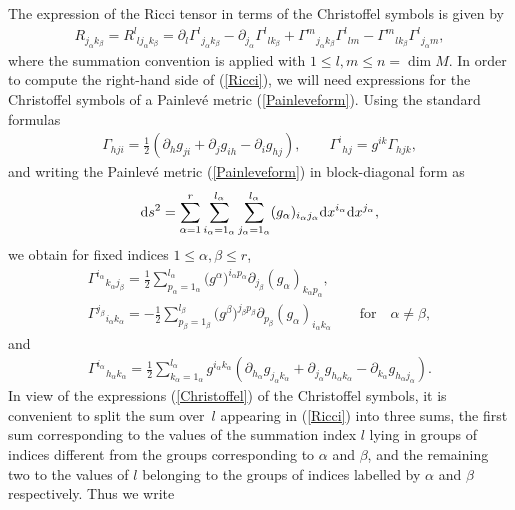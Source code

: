 \documentclass[pdftex]{sigma}
\numberwithin{equation}{section}
\newcommand{\ialpha}{i_{\alpha}}
\newcommand{\jbeta}{j_{\beta}}
\newcommand{\jalpha}{j_{\alpha}}
\newcommand{\kbeta}{k_{\beta}}
\newcommand{\lbeta}{l_{\beta}}
\newcommand{\lalpha}{l_{\alpha}}
\newcommand{\palpha}{p_{\alpha}}
\newcommand{\kalpha}{k_{\alpha}}
\newcommand{\pbeta}{p_{\beta}}
\newcommand{\halpha}{h_{\alpha}}
\begin{document}
The expression of the Ricci tensor in terms of the Christoffel symbols is given by
\begin{gather}\label{Ricci}
R_{\jalpha \kbeta}=R^{l}_{{\phantom l} l \jalpha \kbeta}=\partial_{l}{\Gamma^{l}}_{\jalpha \kbeta}-\partial_{\jalpha}{\Gamma^{l}}_{l\kbeta}+{\Gamma^{m}}_{\jalpha \kbeta}{\Gamma^{l}}_{l m}-{\Gamma^{m}}_{l\kbeta}{\Gamma^{l}}_{\jalpha m},
\end{gather}
where the summation convention is applied with $1\leq l,m \leq n = \dim M$. In order to compute the right-hand side of (\ref{Ricci}), we will need expressions for the Christoffel symbols of a Painlev\'e metric (\ref{Painleveform}). Using the standard formulas
\begin{gather*}%
\Gamma_{hji}=\frac{1}{2}(\partial_{h}g_{ji}+\partial_{j}g_{ih}-\partial_{i}g_{hj}), \qquad {\Gamma^{i}}_{hj}=g^{ik}\Gamma_{hjk},
\end{gather*}
and writing the Painlev\'e metric (\ref{Painleveform}) in block-diagonal form as
\[
{\rm d}s^{2}=\sum_{\alpha = 1}^{r}\sum_{\ialpha=1_{\alpha}}^{\lalpha}\sum_{\jalpha=1_{\alpha}}^{\lalpha}(g_{\alpha})_{\ialpha \jalpha}{\rm d}x^{\ialpha}{\rm d}x^{\jalpha},
\]
we obtain for fixed indices $1\leq \alpha,\beta \leq r$,
\begin{gather}
{\Gamma^{\ialpha}}_{\kalpha \jbeta}=\frac{1}{2}\sum_{\palpha=1_{\alpha}}^{\lalpha} \big(g^{\alpha}\big)^{\ialpha \palpha}\partial_{\jbeta}(g_{\alpha})_{\kalpha \palpha},\nonumber\\
 {\Gamma^{\jbeta}}_{\ialpha \kalpha}=-\frac{1}{2}\sum_{\pbeta=1_{\beta}}^{\lbeta}\big(g^{\beta}\big)^{\jbeta \pbeta}\partial_{\pbeta}(g_{\alpha})_{\ialpha \kalpha}\qquad \text{for} \quad \alpha \neq \beta,\label{Christoffel}
\end{gather}
and
\begin{gather}\label{Christoffelmixed}
{\Gamma^{\ialpha}}_{\halpha \kalpha}=\frac{1}{2}\sum_{\kalpha=1_{\alpha}}^{\lalpha} g^{\ialpha \kalpha}(\partial_{\halpha}g_{\jalpha \kalpha}+\partial_{\jalpha}g_{\halpha \kalpha}-\partial_{\kalpha}g_{\halpha \jalpha}).
\end{gather}
In view of the expressions (\ref{Christoffel}) of the Christoffel symbols, it is convenient to split the sum over~$l$ appearing in (\ref{Ricci}) into three sums, the first sum corresponding to the values of the summation index $l$ lying in groups of indices different from the groups corresponding to $\alpha$ and $\beta$, and the remaining two to the values of $l$ belonging to the groups of indices labelled by $\alpha$ and $\beta$ respectively. Thus we write
\end{document}
